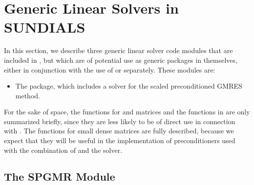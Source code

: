 \chapter{Generic Linear Solvers in SUNDIALS}\label{s:gen_linsolv}
In this section, we describe three generic linear solver code modules that 
are included in {\sundials}, but which are of potential use as generic packages in
themselves, either in conjunction with the use of {\kinsol} or separately.
These modules are:
\begin{itemize}
\item The {\spgmr} package, which includes a solver for the scaled
      preconditioned GMRES method.
\end{itemize}

For the sake of space, the functions for  and
 matrices and the functions in {\spgmr} are only summarized
briefly, since they are less likely to be of direct use in connection
with {\kinsol}.  The functions for small dense matrices are fully
described, because we expect that they will be useful in the
implementation of preconditioners used with the combination of {\kinsol}
and the {\kinspgmr} solver.

\section{The SPGMR Module}\label{ss:spgmr}


